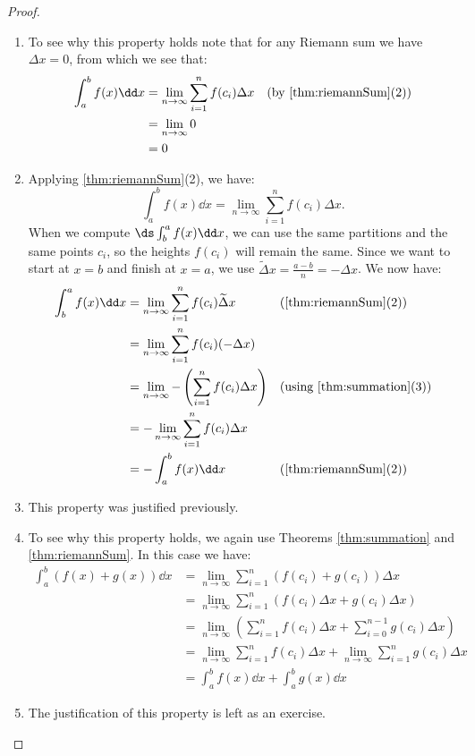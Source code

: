 \begin{proof}\label{pf:defintprop}%
\mbox{}\\[-2\baselineskip]
\begin{enumerate}
\item To see why this property holds note that for any Riemann sum we have $\Delta x=0$, from which we see that: 
\begin{align*}
\int_a^b f(x)\dd x
&=\lim_{n\to\infty}\sum_{i=1}^n f(c_i)\Delta x
\quad \text{(by \autoref{thm:riemannSum}(2))}\\
&=\lim_{n\to\infty} 0\\
&=0\\
\end{align*}

\item Applying \autoref{thm:riemannSum}(2), we have:
\[\int_a^b f(x)\dd x=\lim_{n\to\infty}\sum_{i=1}^n f(c_i)\Delta x.\]
When we compute $\ds\int_b^a f(x)\dd x$, we can use the same partitions and the same points $c_i$, so the heights $f(c_i)$ will remain the same. Since we want to start at $x=b$ and finish at $x=a$, we use $\widetilde\Delta x=\frac{a-b}n=-\Delta x$. We now have:
\begin{align*}
\int_b^a f(x)\dd x
&=\lim_{n\to\infty} \sum_{i=1}^n f(c_i)\widetilde\Delta x
&&\text{(\autoref{thm:riemannSum}(2))}\\
&=\lim_{n\to\infty} \sum_{i=1}^n f(c_i)(-\Delta x)\\
&=\lim_{n\to\infty} -\left(\sum_{i=1}^n f(c_i)\Delta x\right)
&&\text{(using \autoref{thm:summation}(3))}\\
&=-\lim_{n\to\infty} \sum_{i=1}^n f(c_i)\Delta x\\
&=-\int_a^b f(x)\dd x &&\text{(\autoref{thm:riemannSum}(2))}
\end{align*}

\item This property was justified previously.

\item To see why this property holds, we again use Theorems \ref{thm:summation} and \ref{thm:riemannSum}. In this case we have:
{\allowdisplaybreaks
\begin{align*}
\int_a^b(f(x)+g(x))\dd x
&=\lim_{n\to\infty}\sum_{i=1}^n(f(c_i)+g(c_i))\Delta x\\
&=\lim_{n\to\infty} \sum_{i=1}^n (f(c_i)\Delta x+g(c_i)\Delta x)\\
&=\lim_{n\to\infty}\left(\sum_{i=1}^n f(c_i)\Delta x
+\sum_{i=0}^{n-1} g(c_i)\Delta x\right)\\
&=\lim_{n\to\infty}\sum_{i=1}^n f(c_i)\Delta x
+\lim_{n\to\infty}\sum_{i=1}^n g(c_i)\Delta x\\
&=\int_a^b f(x)\dd x+\int_a^bg(x)\dd x
\end{align*}}

\item The justification of this property is left as an exercise.\qedhere
\end{enumerate}
\end{proof}

